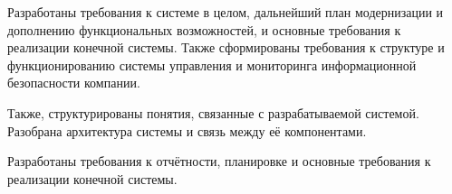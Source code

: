 Разработаны требования к системе в целом, дальнейший план модернизации и дополнению функциональных возможностей, и основные требования к реализации конечной системы. Также сформированы требования к структуре и функционированию системы управления и мониторинга информационной безопасности компании.

Также, структурированы понятия, связанные с разрабатываемой системой. Разобрана архитектура системы и связь между её компонентами.

Разработаны требования к отчётности, планировке и основные требования к реализации конечной системы.


